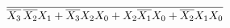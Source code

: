 \documentclass[preview]{standalone}
\begin{document}
\begin{align*}
\overline{\overline{X_3}\nobreak\hspace{.16667em plus .08333em}\overline{X_2}X_1+\overline{X_3}X_2X_0+X_2\overline{X_1}X_0+\overline{X_2}X_1X_0}
\end{align*}
\end{document}

